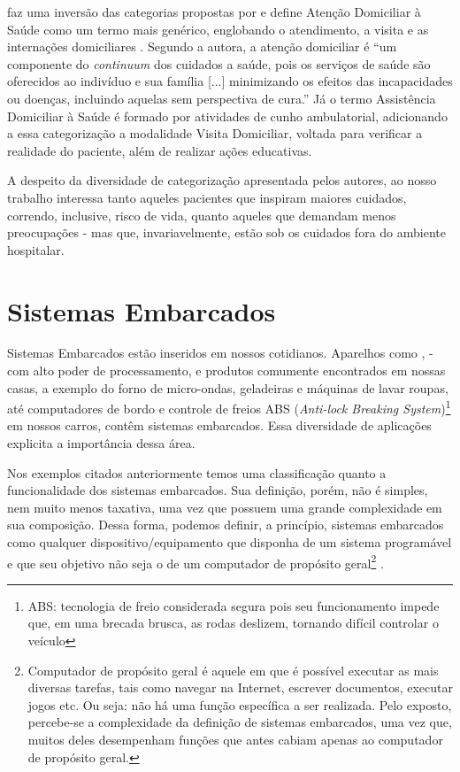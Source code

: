  faz uma inversão das categorias propostas
por  e  define Atenção Domiciliar à
Saúde como um termo mais genérico, englobando o atendimento, a visita e as
internações domiciliares \cite{giacomozzi2006pratica}. Segundo a autora, a
atenção domiciliar é ``um componente do \textit{continuum} dos cuidados a
saúde, pois os serviços de saúde são oferecidos ao indivíduo e sua família
[...] minimizando os efeitos das incapacidades ou doenças, incluindo aquelas
sem perspectiva de cura.'' Já o termo Assistência Domiciliar à Saúde é formado
por atividades de cunho ambulatorial, adicionando a essa categorização a
modalidade Visita Domiciliar, voltada para verificar a realidade do paciente,
além de realizar ações educativas.

A despeito da diversidade de categorização apresentada pelos autores, ao nosso
trabalho interessa tanto aqueles pacientes que inspiram maiores cuidados,
correndo, inclusive, risco de vida, quanto aqueles que demandam menos
preocupações - mas que, invariavelmente, estão sob os cuidados fora do
ambiente hospitalar.

\section{Sistemas Embarcados}\label{sec:sistemas-embarcados}

Sistemas Embarcados estão inseridos em nossos cotidianos. Aparelhos como
\smartphones[], \tablets[] - com alto poder de processamento, e
produtos comumente encontrados em nossas casas, a exemplo do forno de 
micro-ondas, geladeiras e máquinas de lavar roupas, até computadores de bordo e
controle de freios ABS (\textit{Anti-lock Breaking System})\footnote{ABS:
tecnologia  de freio considerada segura pois seu funcionamento impede que, em
uma brecada brusca, as rodas  deslizem, tornando difícil controlar o veículo} em
nossos carros, contêm sistemas embarcados. Essa diversidade de aplicações
explicita a importância dessa área.

Nos exemplos citados anteriormente temos uma classificação quanto a 
funcionalidade dos sistemas embarcados. Sua definição, porém, não é simples, nem muito menos taxativa,
uma vez que possuem uma grande complexidade em sua composição. Dessa forma,
podemos definir, a princípio, sistemas embarcados como qualquer
dispositivo/equipamento que disponha de um sistema programável e que seu
objetivo não seja o de um computador de propósito geral\footnote{Computador de
propósito geral é aquele em que é possível executar as mais diversas tarefas,
tais como navegar na Internet, escrever documentos, executar jogos etc. Ou
seja: não há uma função específica a ser realizada. Pelo exposto, percebe-se a
complexidade da definição de sistemas embarcados, uma vez que, muitos deles
desempenham funções que antes cabiam apenas ao computador de propósito geral.}
\cite{wolf2012computers}.

